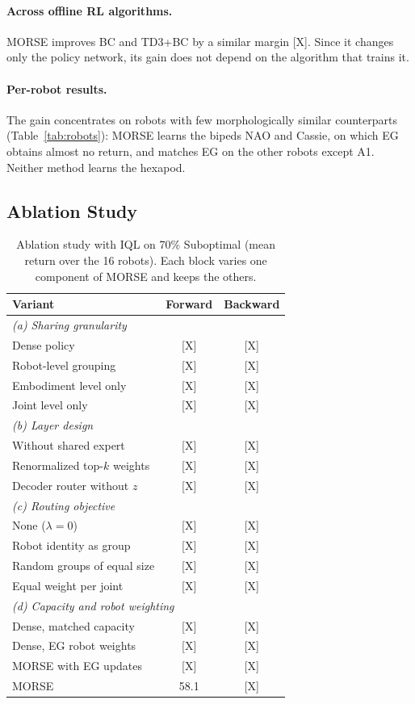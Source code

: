 \paragraph{Across offline RL algorithms.}
MORSE improves BC and TD3+BC by a similar margin [X]. Since it changes only the policy network, its gain does not
depend on the algorithm that trains it.

\paragraph{Per-robot results.}
The gain concentrates on robots with few morphologically similar counterparts (Table~\ref{tab:robots}): MORSE learns
the bipeds NAO and Cassie, on which EG obtains almost no return, and matches EG on the other robots except A1. Neither
method learns the hexapod.

\subsection{Ablation Study}
\label{sec:ablation}

\begin{table}[t]
\centering
\footnotesize
\caption{Ablation study with IQL on 70\% Suboptimal (mean return over the 16 robots). Each block varies one component
of MORSE and keeps the others.}
\label{tab:ablation}
\begin{tabular}{lcc}
\toprule
Variant & Forward & Backward \\
\midrule
\multicolumn{3}{l}{\textit{(a) Sharing granularity}} \\
Dense policy & [X] & [X] \\
Robot-level grouping & [X] & [X] \\
Embodiment level only & [X] & [X] \\
Joint level only & [X] & [X] \\
\multicolumn{3}{l}{\textit{(b) Layer design}} \\
Without shared expert & [X] & [X] \\
Renormalized top-$k$ weights & [X] & [X] \\
Decoder router without $z$ & [X] & [X] \\
\multicolumn{3}{l}{\textit{(c) Routing objective}} \\
None ($\lambda=0$) & [X] & [X] \\
Robot identity as group & [X] & [X] \\
Random groups of equal size & [X] & [X] \\
Equal weight per joint & [X] & [X] \\
\multicolumn{3}{l}{\textit{(d) Capacity and robot weighting}} \\
Dense, matched capacity & [X] & [X] \\
Dense, EG robot weights & [X] & [X] \\
MORSE with EG updates & [X] & [X] \\
\midrule
\rowcolor{ourbg} MORSE & 58.1 & [X] \\
\bottomrule
\end{tabular}
\end{table}


